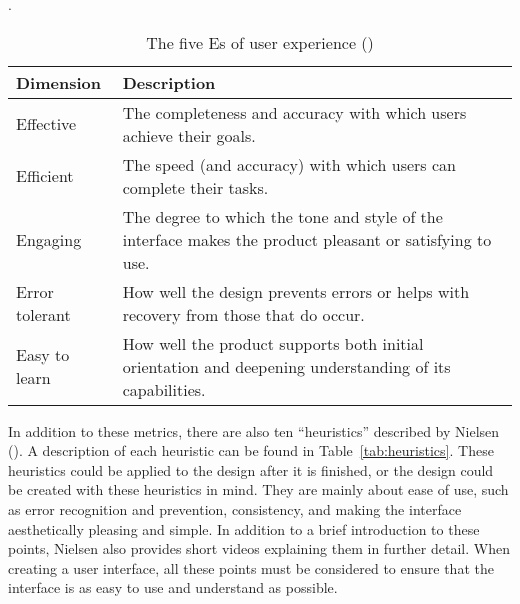 \begin{doublespace}
\begin{singlespace}
\begin{table}[htbp]
    \centering
    \caption{The five Es of user experience (\cite{stone_user_2005})}.
    \label{tab:five_es}
    \begin{tabularx}{1\textwidth}{||Y|Y||}
        \hline \textbf{Dimension} & \textbf{Description} \\
        \hline \hline 
        Effective & The completeness and accuracy with which users achieve their goals. \\ \hline
        Efficient & The speed (and accuracy) with which users can complete their tasks. \\ \hline
        Engaging & The degree to which the tone and style of the interface makes the product pleasant or satisfying to use. \\ \hline
        Error tolerant & How well the design prevents errors or helps with recovery from those that do occur. \\ \hline
        Easy to learn & How well the product supports both initial orientation and deepening understanding of its capabilities. \\ \hline
    \end{tabularx}
\end{table}
\end{singlespace}

\newpage

In addition to these metrics, there are also ten ``heuristics'' described by Nielsen (\cite{nielsen_10_1994}). A description of each heuristic can be found in Table~\ref{tab:heuristics}. These heuristics could be applied to the design after it is finished, or the design could be created with these heuristics in mind. They are mainly about ease of use, such as error recognition and prevention, consistency, and making the interface aesthetically pleasing and simple. In addition to a brief introduction to these points, Nielsen also provides short videos explaining them in further detail. When creating a user interface, all these points must be considered to ensure that the interface is as easy to use and understand as possible.


\end{doublespace}
